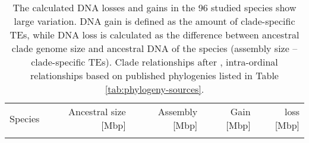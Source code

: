 \begin{center}
\begin{longtable}[t]{lrrrr}
\caption[DNA gain and loss]{The calculated DNA losses and gains in the 96 studied species show large
variation. DNA gain is defined as the amount of clade-specific TEs, while DNA loss is
calculated as the difference between ancestral clade genome size and ancestral DNA of
the species (assembly size – clade-specific TEs). Clade relationships after \citet{Misof2014},
intra-ordinal relationships based on published phylogenies listed in Table \ref{tab:phylogeny-sources}.}
\label{tab:gain-loss}

\footnotesize
\endfirsthead

\multicolumn{2}{c}{%
{\tablename\ \thetable{} --continued}} \\
\toprule
Species                    & Ancestral size {[}Mbp{]} & Assembly {[}Mbp{]} & Gain {[}Mbp{]} & loss {[}Mbp{]} \\
\midrule
\endhead

\bottomrule
\endfoot


\end{longtable}
\end{center}
